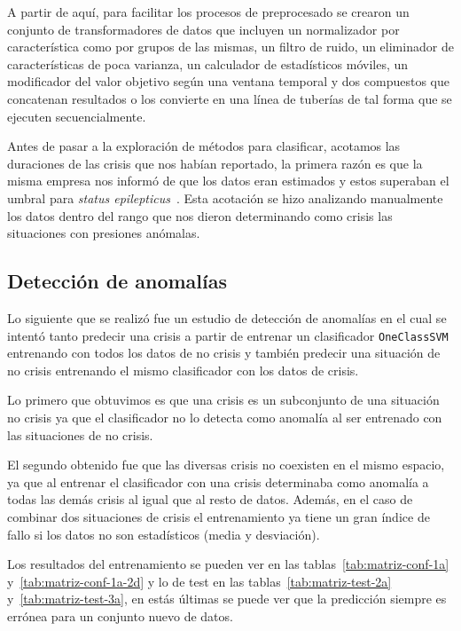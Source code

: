 A partir de aquí, para facilitar los procesos de preprocesado se crearon un conjunto de transformadores de datos que incluyen un normalizador por característica como por grupos de las mismas, un filtro de ruido, un eliminador de características de poca varianza, un calculador de estadísticos móviles, un modificador del valor objetivo según una ventana temporal y dos compuestos que concatenan resultados o los convierte en una línea de tuberías de tal forma que se ejecuten secuencialmente.

Antes de pasar a la exploración de métodos para clasificar, acotamos las duraciones de las crisis que nos habían reportado, la primera razón es que la misma empresa nos informó de que los datos eran estimados y estos superaban el umbral para \textit{status epilepticus}~\cite{epilepsia}. Esta acotación se hizo analizando manualmente los datos dentro del rango que nos dieron determinando como crisis las situaciones con presiones anómalas. 

\subsection{Detección de anomalías}
Lo siguiente que se realizó fue un estudio de detección de anomalías en el cual se intentó tanto predecir una crisis a partir de entrenar un clasificador \texttt{OneClassSVM} entrenando con todos los datos de no crisis y también predecir una situación de no crisis entrenando el mismo clasificador con los datos de crisis.

Lo primero que obtuvimos es que una crisis es un subconjunto de una situación no crisis ya que el clasificador no lo detecta como anomalía al ser entrenado con las situaciones de no crisis.

El segundo obtenido fue que las diversas crisis no coexisten en el mismo espacio, ya que al entrenar el clasificador con una crisis determinaba como anomalía a todas las demás crisis al igual que al resto de datos. Además, en el caso de combinar dos situaciones de crisis el entrenamiento ya tiene un gran índice de fallo si los datos no son estadísticos (media y desviación).

Los resultados del entrenamiento se pueden ver en las tablas~\ref{tab:matriz-conf-1a} y~\ref{tab:matriz-conf-1a-2d} y lo de test en las tablas~\ref{tab:matriz-test-2a} y~\ref{tab:matriz-test-3a}, en estás últimas se puede ver que la predicción siempre es errónea para un conjunto nuevo de datos.


